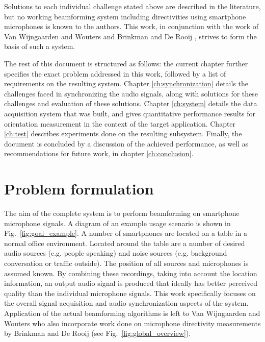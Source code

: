 \documentclass[a4paper, notitlepage]{report}
\begin{document}
Solutions to each individual challenge stated above are described in the literature, but no working beamforming system including directivities using smartphone microphones is known to the authors. This work, in conjunction with the work of Van Wijngaarden and Wouters \cite{BAP:ErikNiels} and Brinkman and De Rooij \cite{BAP:RosalieTim}, strives to form the basis of such a system. 

The rest of this document is structured as follows: the current chapter further specifies the exact problem addressed in this work, followed by a list of requirements on the resulting system. Chapter \ref{ch:synchronization} details the challenges faced in synchronizing the audio signals, along with solutions for these challenges and evaluation of these solutions.
Chapter \ref{ch:system} details the data acquisition system that was built, and gives quantitative performance results for orientation measurement in the context of the target application.
Chapter \ref{ch:test} describes experiments done on the resulting subsystem. Finally, the document is concluded by a discussion of the achieved performance, as well as recommendations for future work, in chapter \ref{ch:conclusion}.

\section{Problem formulation}

The aim of the complete system is to perform beamforming on smartphone microphone signals. A diagram of an example usage scenario is shown in Fig.~\ref{fig:goal_example}. A number of smartphones are located on a table in a normal office environment. Located around the table are a number of desired audio sources (e.g. people speaking) and noise sources (e.g. background conversation or traffic outside). The position of all sources and microphones is assumed known.
By combining these recordings, taking into account the location information, an output audio signal is produced that ideally has better perceived quality than the individual microphone signals.
This work specifically focuses on the overall signal acquisition and audio synchronization aspects of the system. Application of the actual beamforming algorithms is left to Van Wijngaarden and Wouters \cite{BAP:ErikNiels} who also incorporate work done on microphone directivity measurements by Brinkman and De Rooij \cite{BAP:RosalieTim} (see Fig.~\ref{fig:global_overview}).
\end{document}
